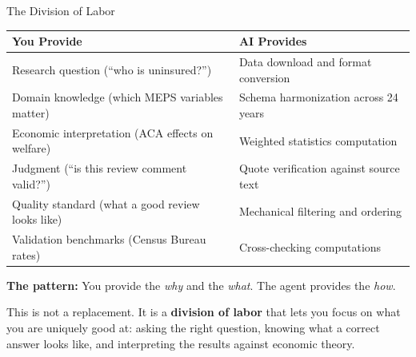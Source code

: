 \documentclass[10pt,english,aspectratio=169]{beamer}
\begin{document}
\begin{frame}{The Division of Labor}

\begin{small}
\begin{tabular}{p{6cm}p{6cm}}
\toprule
\textbf{You Provide} & \textbf{AI Provides} \\
\midrule
Research question (``who is uninsured?'') & Data download and format conversion \\
Domain knowledge (which MEPS variables matter) & Schema harmonization across 24 years \\
Economic interpretation (ACA effects on welfare) & Weighted statistics computation \\
Judgment (``is this review comment valid?'') & Quote verification against source text \\
Quality standard (what a good review looks like) & Mechanical filtering and ordering \\
Validation benchmarks (Census Bureau rates) & Cross-checking computations \\
\bottomrule
\end{tabular}
\end{small}

\vspace{0.4cm}
\textbf{The pattern:} You provide the \emph{why} and the \emph{what}. The agent provides the \emph{how}.

\vspace{0.2cm}
This is not a replacement. It is a \textbf{division of labor} that lets you focus on what you are uniquely good at: asking the right question, knowing what a correct answer looks like, and interpreting the results against economic theory.

\end{frame}
\end{document}
